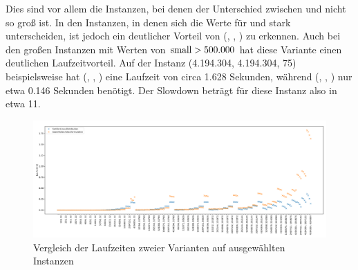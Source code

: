 Dies sind vor allem die Instanzen, bei denen der Unterschied zwischen \la{} und \sm{} nicht so groß ist.
In den Instanzen, in denen sich die Werte für \sm{} und \la{} stark unterscheiden, ist jedoch ein 
deutlicher Vorteil von (\SorSor, \true, \distr) zu erkennen. Auch bei den \glqq großen\grqq{} Instanzen
mit Werten von $\text{small{}}> 500.000$ hat diese Variante einen deutlichen Laufzeitvorteil.
Auf der Instanz (4.194.304, 4.194.304, 75) beispielsweise hat (\SeaUSet, \false, \perm) eine Laufzeit
von circa 1.628 Sekunden, während (\SorSor, \true, \distr) nur etwa 0.146 Sekunden benötigt. Der Slowdown
beträgt für diese Instanz also in etwa 11. 
\begin{figure}
\centering
	\includegraphics[width = \textwidth]{figures/small_aufsteigend.pdf}
	\caption{Vergleich der Laufzeiten zweier Varianten auf ausgewählten Instanzen}
	\label{fig:messung_small}
\end{figure}




